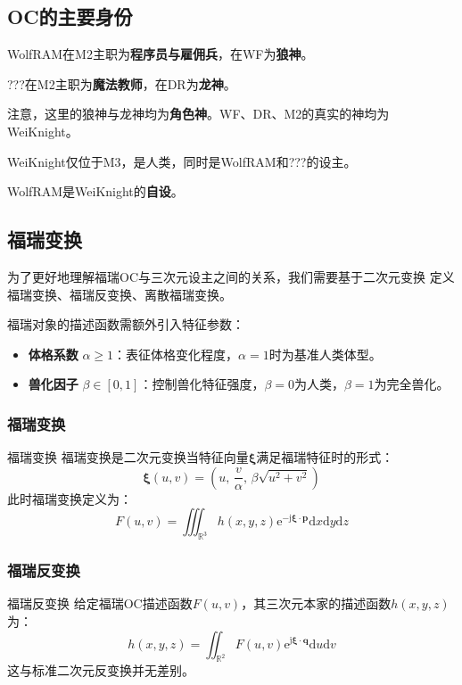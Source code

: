 \documentclass[lang=cn,newtx,10pt,scheme=chinese]{elegantbook}
\newcommand{\wf}{WolfRAM}
\newcommand{\dr}{???}
\newcommand{\wkn}{WeiKnight}
\newcommand{\md}{\mathrm{d}}
\newcommand{\me}{\mathrm{e}}
\newcommand{\mj}{\mathrm{j}}
\begin{document}
\subsection{OC的主要身份}
\wf{}在M2主职为\textbf{程序员与雇佣兵}，在WF为\textbf{狼神}。

\dr{}在M2主职为\textbf{魔法教师}，在DR为\textbf{龙神}。

注意，这里的狼神与龙神均为\textbf{角色神}。WF、DR、M2的真实的神均为\wkn{}。

\wkn{}仅位于M3，是人类，同时是\wf{}和\dr{}的设主。

\wf{}是\wkn{}的\textbf{自设}。

\subsection{福瑞变换}
为了更好地理解福瑞OC与三次元设主之间的关系，我们需要基于二次元变换
定义福瑞变换、福瑞反变换、离散福瑞变换。

福瑞对象的描述函数需额外引入特征参数：
\begin{itemize}
    \item \textbf{体格系数} \(\alpha \geq 1\)：表征体格变化程度，\(\alpha=1\)时为基准人类体型。
    \item \textbf{兽化因子} \(\beta \in [0,1]\)：控制兽化特征强度，\(\beta=0\)为人类，\(\beta=1\)为完全兽化。
\end{itemize}

\subsubsection{福瑞变换}
\begin{definition}{福瑞变换}
    福瑞变换是二次元变换当特征向量\(\bm{\xi}\)满足福瑞特征时的形式：
    \[
        \bm{\xi}(u,v) = \left(u,\, \frac{v}{\alpha},\, \beta\sqrt{u^2+v^2}\right)
    \]
    此时福瑞变换定义为：
    \[
        F(u, v) = \iiint_{\mathbb{R}^3} h(x,y,z) \me^{-\mj \bm{\xi} \cdot \bm{p}} \md x \md y \md z
    \]
\end{definition}


\subsubsection{福瑞反变换}
\begin{definition}{福瑞反变换}
    给定福瑞OC描述函数\(F(u, v)\)，其三次元本家的描述函数\(h(x,y,z)\)为：
    \[
        h(x,y,z) = \iint_{\mathbb{R}^2} F(u, v) \me^{\mj \bm{\xi} \cdot \bm{q}} \md u \md v
    \]
    这与标准二次元反变换并无差别。
\end{definition}
\end{document}
